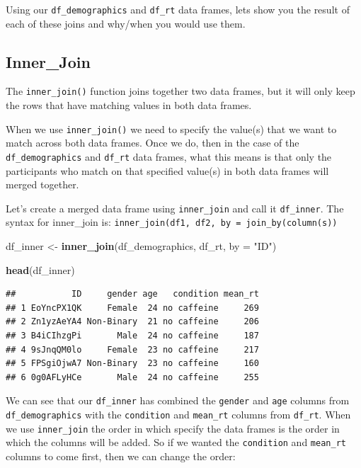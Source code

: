 \documentclass[
]{book}
\newenvironment{Shaded}{\begin{snugshade}}{\end{snugshade}}
\newcommand{\AttributeTok}[1]{\textcolor[rgb]{0.13,0.29,0.53}{#1}}
\newcommand{\FunctionTok}[1]{\textcolor[rgb]{0.13,0.29,0.53}{\textbf{#1}}}
\newcommand{\NormalTok}[1]{#1}
\newcommand{\OtherTok}[1]{\textcolor[rgb]{0.56,0.35,0.01}{#1}}
\newcommand{\StringTok}[1]{\textcolor[rgb]{0.31,0.60,0.02}{#1}}
\begin{document}
Using our \texttt{df\_demographics} and \texttt{df\_rt} data frames, lets show you the result of each of these joins and why/when you would use them.

\hypertarget{inner_join}{%
\subsection{Inner\_Join}\label{inner_join}}

The \texttt{inner\_join()} function joins together two data frames, but it will only keep the rows that have matching values in both data frames.

When we use \texttt{inner\_join()} we need to specify the value(s) that we want to match across both data frames. Once we do, then in the case of the \texttt{df\_demographics} and \texttt{df\_rt} data frames, what this means is that only the participants who match on that specified value(s) in both data frames will merged together.

Let's create a merged data frame using \texttt{inner\_join} and call it \texttt{df\_inner}. The syntax for inner\_join is: \texttt{inner\_join(df1,\ df2,\ by\ =\ join\_by(column(s))}

\begin{Shaded}
\begin{Highlighting}[]
\NormalTok{df\_inner }\OtherTok{\textless{}{-}} \FunctionTok{inner\_join}\NormalTok{(df\_demographics, df\_rt, }\AttributeTok{by =} \StringTok{"ID"}\NormalTok{)}

\FunctionTok{head}\NormalTok{(df\_inner)}
\end{Highlighting}
\end{Shaded}

\begin{verbatim}
##           ID     gender age   condition mean_rt
## 1 EoYncPX1QK     Female  24 no caffeine     269
## 2 Zn1yzAeYA4 Non-Binary  21 no caffeine     206
## 3 B4iCIhzgPi       Male  24 no caffeine     187
## 4 9sJnqQM0lo     Female  23 no caffeine     217
## 5 FPSgiOjwA7 Non-Binary  23 no caffeine     160
## 6 0g0AFLyHCe       Male  24 no caffeine     255
\end{verbatim}

We can see that our \texttt{df\_inner} has combined the \texttt{gender} and \texttt{age} columns from \texttt{df\_demographics} with the \texttt{condition} and \texttt{mean\_rt} columns from \texttt{df\_rt}. When we use \texttt{inner\_join} the order in which specify the data frames is the order in which the columns will be added. So if we wanted the \texttt{condition} and \texttt{mean\_rt} columns to come first, then we can change the order:
\end{document}
